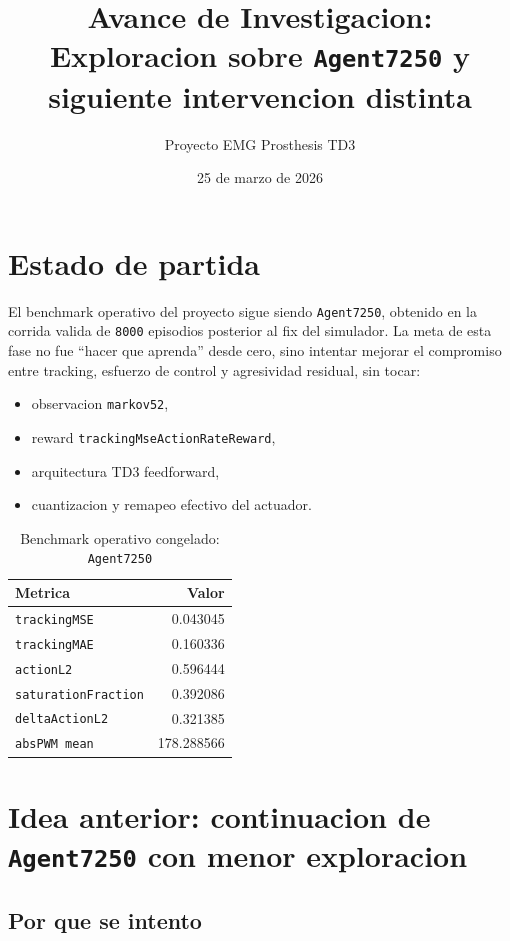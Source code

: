\documentclass[11pt,a4paper]{article}
\title{Avance de Investigacion:\\ Exploracion sobre \texttt{Agent7250} y siguiente intervencion distinta}
\author{Proyecto EMG Prosthesis TD3}
\date{25 de marzo de 2026}
\begin{document}
\maketitle

\section{Estado de partida}

El benchmark operativo del proyecto sigue siendo \texttt{Agent7250}, obtenido en la corrida valida de \texttt{8000} episodios posterior al fix del simulador. La meta de esta fase no fue ``hacer que aprenda'' desde cero, sino intentar mejorar el compromiso entre tracking, esfuerzo de control y agresividad residual, sin tocar:

\begin{itemize}
\item observacion \texttt{markov52},
\item reward \texttt{trackingMseActionRateReward},
\item arquitectura TD3 feedforward,
\item cuantizacion y remapeo efectivo del actuador.
\end{itemize}

\begin{table}[H]
\centering
\caption{Benchmark operativo congelado: \texttt{Agent7250}}
\begin{tabular}{lr}
\toprule
Metrica & Valor \\
\midrule
\texttt{trackingMSE} & 0.043045 \\
\texttt{trackingMAE} & 0.160336 \\
\texttt{actionL2} & 0.596444 \\
\texttt{saturationFraction} & 0.392086 \\
\texttt{deltaActionL2} & 0.321385 \\
\texttt{absPWM mean} & 178.288566 \\
\bottomrule
\end{tabular}
\end{table}

\section{Idea anterior: continuacion de \texttt{Agent7250} con menor exploracion}

\subsection{Por que se intento}
\end{document}
